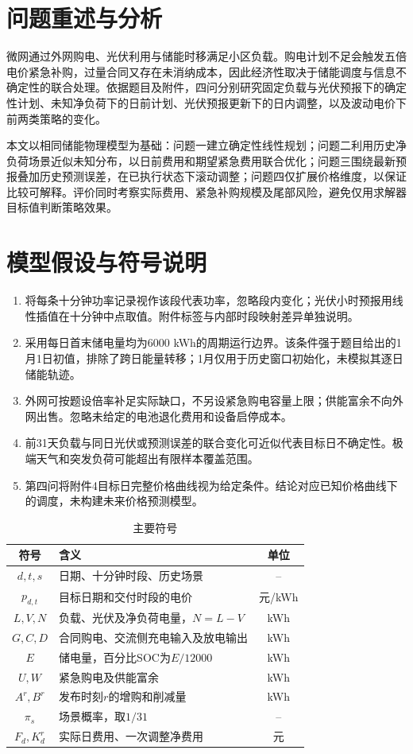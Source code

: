 \section{问题重述与分析}
微网通过外网购电、光伏利用与储能时移满足小区负载。购电计划不足会触发五倍电价紧急补购，过量合同又存在未消纳成本，因此经济性取决于储能调度与信息不确定性的联合处理。依据题目及附件\cite{problem}，四问分别研究固定负载与光伏预报下的确定性计划、未知净负荷下的日前计划、光伏预报更新下的日内调整，以及波动电价下前两类策略的变化。

本文以相同储能物理模型为基础：问题一建立确定性线性规划；问题二利用历史净负荷场景近似未知分布，以日前费用和期望紧急费用联合优化；问题三围绕最新预报叠加历史预测误差，在已执行状态下滚动调整；问题四仅扩展价格维度，以保证比较可解释。评价同时考察实际费用、紧急补购规模及尾部风险，避免仅用求解器目标值判断策略效果。

\section{模型假设与符号说明}
\begin{enumerate}
\item 将每条十分钟功率记录视作该段代表功率，忽略段内变化；光伏小时预报用线性插值在十分钟中点取值。附件标签与内部时段映射差异单独说明。
\item 采用每日首末储电量均为6000 kWh的周期运行边界。该条件强于题目给出的1月1日初值，排除了跨日能量转移；1月仅用于历史窗口初始化，未模拟其逐日储能轨迹。
\item 外网可按题设倍率补足实际缺口，不另设紧急购电容量上限；供能富余不向外网出售。忽略未给定的电池退化费用和设备启停成本。
\item 前31天负载与同日光伏或预测误差的联合变化可近似代表目标日不确定性。极端天气和突发负荷可能超出有限样本覆盖范围。
\item 第四问将附件4目标日完整价格曲线视为给定条件。结论对应已知价格曲线下的调度，未构建未来价格预测模型。
\end{enumerate}
\begin{table}[H]\centering\caption{主要符号}\small
\begin{tabular}{clc}\toprule 符号&含义&单位\\\midrule
$d,t,s$&日期、十分钟时段、历史场景&--\\
$p_{d,t}$&目标日期和交付时段的电价&元/kWh\\
$L,V,N$&负载、光伏及净负荷电量，$N=L-V$&kWh\\
$G,C,D$&合同购电、交流侧充电输入及放电输出&kWh\\
$E$&储电量，百分比SOC为$E/12000$&kWh\\
$U,W$&紧急购电及供能富余&kWh\\
$A^r,B^r$&发布时刻$r$的增购和削减量&kWh\\
$\pi_s$&场景概率，取$1/31$&--\\
$F_d,K_d^r$&实际日费用、一次调整净费用&元\\\bottomrule
\end{tabular}\end{table}

